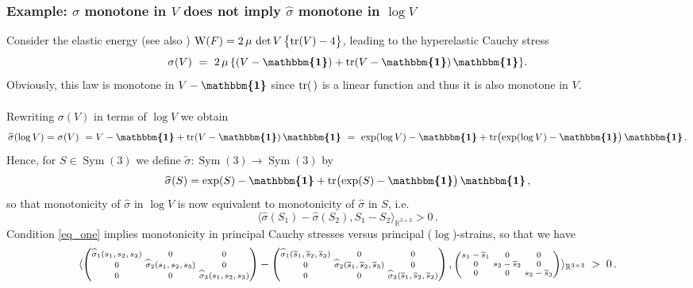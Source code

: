\documentclass[10pt]{article}
\numberwithin{theoremCounter}{section}
\theoremstyle{plain}
\theoremstyle{definition}
\newcommand{\id}{{\boldsymbol{\mathbbm{1}}}}
\newcommand{\R}{\mathbb{R}}
\newcommand{\matr}[1]{\begin{pmatrix}#1\end{pmatrix}}
\newcommand{\WW}{\mathrm{W}}
\newcommand{\innerproduct}[1]{\langle #1 \rangle}
\newcommand{\iprod}{\innerproduct}
\DeclareMathOperator{\Sym}{Sym}
\DeclareMathOperator{\tr}{tr}
\def\tr{\textnormal{tr}}
\numberwithin{equation}{section}
\begin{document}
\begin{appendix}
\subsubsection{Example: $\sigma$ monotone in $V$ does not imply $\widehat \sigma$ monotone in $\log V$} \label{appendixex1}
%
Consider the elastic energy (see also \cite{richter1948isotrope}) $\WW(F) = 2\,\mu\,\det V\,\bigl\{\tr(V)-4\bigr\}$, leading to the hyperelastic Cauchy stress
	\begin{equation}\label{sVp}
	\sigma(V)\ =\ 2\,\mu\, \{(V-\id) + \tr(V-\id)\,\id \}.
	\end{equation}
Obviously, this law is monotone in $V-\id$ since $\tr(\,)$ is a linear function and thus it is also monotone in $V$. \\
\\
Rewriting $\sigma(V)$ in terms of $\log V$ we obtain
	\begin{equation}
	\widehat\sigma(\log V) = \sigma(V)\ = V - \id + \tr(V-\id)\,\id\ =\ \exp(\log V) - \id + \tr\bigl(\exp(\log V)-\id\bigr)\,\id\,.
	\end{equation}
Hence, for $S\in\Sym(3)$ we define $ \widetilde\sigma\colon\Sym(3)\to\Sym(3)$ by
	\begin{equation}
	\widehat\sigma(S) = \exp(S)-\id + \tr\bigl(\exp(S)-\id\bigr)\,\id\,,
	\end{equation}
so that monotonicity of $\widehat \sigma$ in $\log V$ is now equivalent to monotonicity of $\widehat \sigma$ in $S$, i.e.
	\begin{equation}\label{eq_one}
	\iprod{ \widehat\sigma(S_1)- \widehat\sigma(S_2),S_1-S_2}_{\R^{3\times 3}} > 0\,.
	\end{equation}
Condition \eqref{eq_one} implies monotonicity in principal Cauchy stresses versus principal ($\log$)-strains, so that we have
	\begin{equation}\label{eq_two}{\scriptsize
	\iprod{\matr{  \widehat\sigma_1(s_1,s_2,s_3) & 0 & 0 \\ 0 & \!\!\!\!\! \widehat\sigma_2(s_1,s_2,s_3)\!\!\!\!\! & 0 \\ 0 & 0 &  \widehat\sigma_3(s_1,s_2,s_3) }-\matr{  \widehat\sigma_1(\overline s_1,\overline s_2,\overline s_3) & 0 & 0 \\ 0 & \!\!\!\!\! \widehat\sigma_2(\overline s_1,\overline s_2,\overline s_3)\!\!\!\!\! & 0 \\ 0 & 0 &  \widehat\sigma_3(\overline s_1,\overline s_2,\overline s_3) } , \matr{ s_1-\overline s_1 & 0 & 0 \\ 0 & \!\!\!\!\!s_2-\overline s_2\!\!\!\!\! & 0 \\ 0 & 0 & s_3-\overline s_3} }_{\R^{3\times 3}}\ >\ 0}\,.

\end{equation}
\end{appendix}
\end{document}
